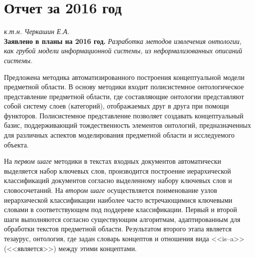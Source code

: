 \documentclass[12pt,a4paper]{ltxdoc}
\begin{document}
\section{Отчет за 2016 год}
\label{sec:report2016}

\begin{raggedleft}
{}\hfill  {\itshape к.т.н. Черкашин Е.А.}\\
{\bfseries Заявлено в планы на 2016 год.} {\itshape Разработка методов извлечения
онтологии, как грубой модели информационной системы, из неформализованных описаний системы.}
\end{raggedleft}

Предложена методика автоматизированного построения концептуальной модели предметной области. В основу методики входит полисистемное онтологическое представление предметной области, где составляющие онтологии представляют собой систему слоев (категорий), отображаемых друг в друга при помощи функторов. Полисистемное представление позволяет создавать концептуальный базис, поддерживающий тождественность элементов онтологий, предназначенных для различных аспектов моделирования предметной области и исследуемого объекта.

На \emph{первом шаге} методики в текстах входных документов автоматически выделяется набор ключевых слов, производится построение иерархической классификаций документов согласно выделенному набору ключевых слов и словосочетаний. На \emph{втором шаге} осуществляется поименование узлов иерархической классификации наиболее часто встречающимися ключевыми словами в соответствующем под поддереве классификации. Первый и второй шаги выполняются согласно существующим алгоритмам, адаптированным для обработки текстов предметной области. Результатом второго этапа является тезаурус, онтология, где задан словарь концептов и отношения вида <<is--a>> (<<является>>) между этими концептами.
\end{document}
